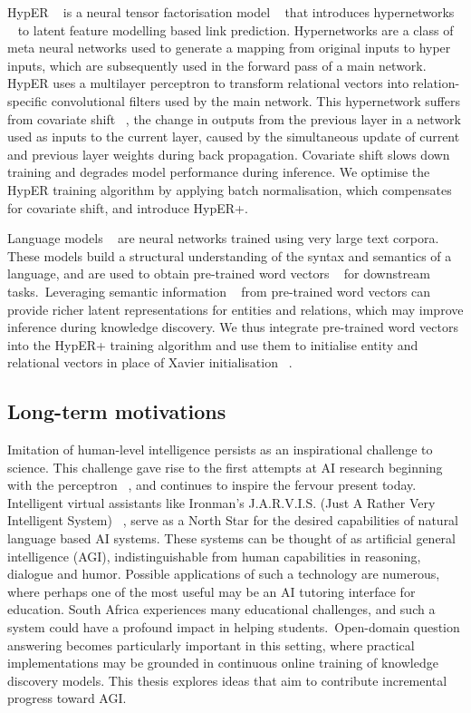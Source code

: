 \noindent HypER \unskip~\citep{balazevic2019hypernetwork} is a neural tensor factorisation model \unskip~\citep{wu2018neural} that introduces hypernetworks \unskip~\citep{ha2016hypernetworks} to latent feature modelling based link prediction. Hypernetworks are a class of meta neural networks used to generate a mapping from original inputs to hyper inputs, which are subsequently used in the forward pass of a main network. HypER uses a multilayer perceptron to transform relational vectors into relation-specific convolutional filters used by the main network. This hypernetwork suffers from covariate shift \unskip~\citep{ioffe2015batch}, the change in outputs from the previous layer in a network used as inputs to the current layer, caused by the simultaneous update of current and previous layer weights during back propagation. Covariate shift slows down training and degrades model performance during inference. We optimise the HypER training algorithm by applying batch normalisation, which compensates for covariate shift, and introduce HypER+. \par

\noindent Language models \unskip~\citep{turian2010word} are neural networks trained using very large text corpora. These models build a structural understanding of the syntax and semantics of a language, and are used to obtain pre-trained word vectors \unskip~\citep{mikolov2013distributed} for downstream tasks.\ Leveraging semantic information \unskip~\citep{socher2013reasoning} from pre-trained word vectors can provide richer latent representations for entities and relations, which may improve inference during knowledge discovery. We thus integrate pre-trained word vectors into the HypER+ training algorithm and use them to initialise entity and relational vectors in place of Xavier initialisation \unskip~\citep{glorot2010understanding}. 

\subsection{Long-term motivations} 

Imitation of human-level intelligence persists as an inspirational challenge to science. This challenge gave rise to the first attempts at AI research beginning with the perceptron \unskip~\citep{rosenblatt1958perceptron}, and continues to inspire the fervour present today. Intelligent virtual assistants like Ironman's J.A.R.V.I.S. (Just A Rather Very Intelligent System) \unskip~\citep{jarvisIronmanWiki}, serve as a North Star for the desired capabilities of natural language based AI systems. These systems can be thought of as artificial general intelligence (AGI), indistinguishable from human capabilities in reasoning, dialogue and humor. Possible applications of such a technology are numerous, where perhaps one of the most useful may be an AI tutoring interface for education. South Africa experiences many educational challenges, and such a system could have a profound impact in helping students.\ Open-domain question answering becomes particularly important in this setting, where practical implementations may be grounded in continuous online training of knowledge discovery models. This thesis explores ideas that aim to contribute incremental progress toward AGI.  

